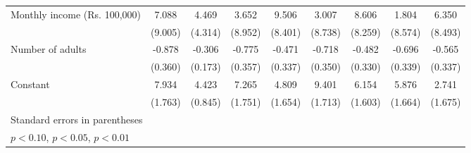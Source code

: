 \begin{table}[htbp]
{\begin{tabular}{l*{1}{cccccccc}}
Monthly income (Rs. 100,000)&       7.088   &       4.469  &       3.652  &       9.506    &       3.007  &       8.606  &       1.804 &       6.350\\
                      &     (9.005)  &     (4.314)  &     (8.952)  &     (8.401)  &     (8.738)&     (8.259)  &     (8.574) &     (8.493) \\

Number of adults    &      -0.878\sym{**}  &      -0.306\sym{*} &      -0.775\sym{**}  &      -0.471  &      -0.718\sym{**} &      -0.482 &      -0.696\sym{**}  &      -0.565\sym{*}\\
                     &     (0.360)    &     (0.173)  &     (0.357) &     (0.337)   &     (0.350) &     (0.330)&     (0.339)  &     (0.337)  \\

Constant            &       7.934\sym{***}&       4.423\sym{***} &       7.265\sym{***} &       4.809\sym{***}  &       9.401\sym{***}&       6.154\sym{***} &       5.876\sym{***} &       2.741 \\
                    &     (1.763)   &     (0.845) &     (1.751)  &     (1.654)     &     (1.713) &     (1.603)&     (1.664)  &     (1.675) \\

\bottomrule
\multicolumn{9}{l}{\footnotesize Standard errors in parentheses}\\
\multicolumn{9}{l}{\footnotesize \sym{*} \(p<0.10\), \sym{**} \(p<0.05\), \sym{***} \(p<0.01\)}\\
\end{tabular}}
\end{table}
